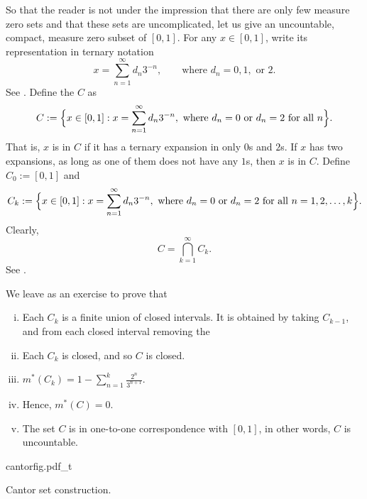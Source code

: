 \begin{example} \label{example:cantor}
So that the reader is not under the impression that there are only few
measure zero sets and that these sets are uncomplicated,
let us give an uncountable, compact, measure zero subset of $[0,1]$.
For any $x \in [0,1]$, write its
representation in ternary notation
\begin{equation*}
x = \sum_{n=1}^\infty d_n 3^{-n} ,
\qquad \text{where } d_n=0, 1, \text{ or } 2.
\end{equation*}
See .
Define the \emph{} $C$ as
\begin{equation*}
C := \Bigl\{ x \in [0,1] : x = \sum_{n=1}^\infty d_n 3^{-n},
\text{ where } d_n = 0 \text{ or } d_n = 2 \text{ for all } n \Bigr\} .
\end{equation*}
That is, $x$ is in $C$ if it has a ternary expansion in only $0$s and
$2$s.  If $x$ has two expansions, as long as one of them does not have any
$1$s, then $x$ is in $C$.
Define $C_0 := [0,1]$ and
\begin{equation*}
C_k := \Bigl\{ x \in [0,1] : x = \sum_{n=1}^\infty d_n 3^{-n},
\text{ where } d_n = 0 \text{ or } d_n = 2 \text{ for all } n=1,2,\ldots,k \Bigr\} .
\end{equation*}
Clearly,
\begin{equation*}
C = \bigcap_{k=1}^\infty C_k .
\end{equation*}
See .

We leave as an exercise to prove that
\begin{enumerate}[(i)]
\item Each $C_k$ is a finite union of closed intervals.  It is obtained by
taking $C_{k-1}$, and from each closed interval removing the
\item Each $C_k$ is closed, and so $C$ is closed.
\item 
$m^*(C_k) =1 - \sum_{n=1}^k \frac{2^n}{3^{n+1}}$.
\item Hence,
$m^*(C) = 0$.
\item The set $C$ is in one-to-one correspondence with $[0,1]$, in other
words, $C$ is
uncountable.
\end{enumerate}
\begin{myfigureht}
{cantorfig.pdf_t}
\caption{Cantor set construction.\label{fig:cantor}}
\end{myfigureht}
\end{example}



